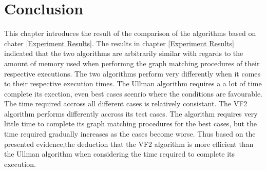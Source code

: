 \section{Conclusion}
\label{Conclusion}
This chapter introduces the result of the comparison of the algorithms based on chater \ref{Experiment Results}. The results in chapter \ref{Experiment Results} 
indicated that the two algorithms are arbitrarily similar with regards to the amount of memory used when performng the graph matching procedures of their
respective executions.\newline\newline
The two algorithms perform very differently when it comes to their respective execution times. The Ullman algorithm requires a a lot of time complete its 
exection, even best cases scenrio where the conditions are favourable. The time required accross all different cases is relatively consistant.\newline
The VF2 algorithm performs differently accross its test cases. The algorithm requires very little time to complete its graph matching procedures for the 
best cases, but the time required gradually increases as the cases become worse. Thus based on the presented evidence,the deduction that the VF2 algorithm 
is more efficient than the Ullman algorithm when considering the time required to complete its execution.
\newpage
